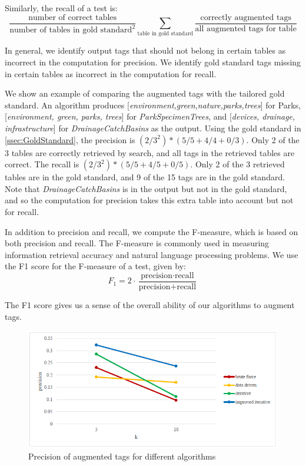 Similarly, the recall of a test is:
\[
\frac{\text{number of correct tables}}{\text{number of tables in gold standard}^{2}}\sum\limits _{\text{table in gold standard}}\frac{\text{correctly augmented tags}}{\text{all augmented tags for table}}
\]

In general, we identify output tags that should not belong in certain tables as incorrect in the computation for precision. We identify gold standard tags missing in certain tables as incorrect in the computation for recall.

We show an example of comparing the augmented tags with the tailored gold standard. An algorithm produces [\textit{environment,green,nature,parks,trees}] for Parks, [\textit{environment, green, parks, trees}] for \textit{ParkSpecimenTrees}, and [\textit{devices, drainage, infrastructure}] for \textit{DrainageCatchBasins} as the output. Using the gold standard in \autoref{ssec:GoldStandard}, the precision is $(2/3^{2})*(5/5+4/4+0/3)$. Only 2 of the 3 tables are correctly retrieved by search, and all tags in the retrieved tables are correct. The recall is $(2/3^{2})*(5/5 + 4/5 + 0/5)$. Only 2 of the 3 retrieved tables are in the gold standard, and 9 of the 15 tags are in the gold standard. Note that \textit{DrainageCatchBasins} is in the output but not in the gold standard, and so the computation for precision takes this extra table into account but not for recall.

In addition to precision and recall, we compute the F-measure, which is based on both precision and recall. The F-measure is commonly used in measuring information retrieval accuracy and natural language processing problems. We use the F1 score for the F-measure of a test, given by:
\[
\ensuremath{F_{1}}=2\ensuremath{\cdot}\frac{\text{precision}\cdot\text{recall}}{\text{precision}+\text{recall}}
\]

The F1 score gives us a sense of the overall ability of our algorithms to augment tags.

\begin{figure}
    \centering
    \includegraphics[width=5in]{figures/precision-different-algorithms.png}
    \caption{Precision of augmented tags for different algorithms}
    \label{fig:precision-different-algorithms}
\end{figure}

